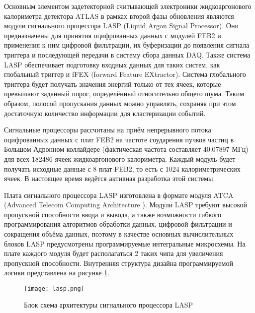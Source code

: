 Основным элементом задетекторной считывающей электроники жидкоаргонового калориметра детектора ATLAS в рамках второй фазы обновления являются модули сигнального процессора LASP (Liquid Argon Signal Processor). Они предназначены для принятия оцифрованных данных с модулей FEB2 и применения к ним цифровой фильтрации, их буферизации до появления сигнала триггера и последующей передачи в систему сбора данных DAQ. Также система LASP обеспечивает подготовку входных данных для таких систем, как глобальный триггер и fFEX (forward Feature EXtractor). Система глобального триггера будет получать значения энергий только от тех ячеек, которые превышают заданный порог, определённый относительно общего шума. Таким образом, полосой пропускания данных можно управлять, сохраняя при этом достаточную количество информации для кластеризации событий.\par
Сигнальные процессоры рассчитаны на приём непрерывного потока оцифрованных данных с плат FEB2 на частоте соударения пучков частиц в Большом Адронном коллайдере (фактическая частота составляет 40.07897 МГц) для всех 182486 ячеек жидкоаргонового калориметра. Каждый модуль будет получать исходные данные с 8 плат FEB2, то есть с 1024 калориметрических ячеек. В настоящее время ведётся активная разработка этой системы.\par
Плата сигнального процессора LASP изготовлена в формате модуля ATCA (Advanced Telecom Computing Architecture \parencite{atca}). Модули LASP требуют высокой пропускной способности ввода и вывода, а также возможности гибкого программирования алгоритмов обработки данных, цифровой фильтрации и сокращения объёма данных, поэтому в качестве основных вычислительных блоков LASP предусмотрены программируемые интегральные микросхемы. На плате каждого модуля будет располагаться 2 таких чипа для увеличения пропускной способности. Внутренняя структура дизайна программируемой логики представлена на рисунке \ref{fig:lasp}.

\begin{figure}[ht]
    \centering
    \texttt{[image: lasp.png]}
    \caption{Блок схема архитектуры сигнального процессора LASP}
    \label{fig:lasp}
\end{figure}\par

